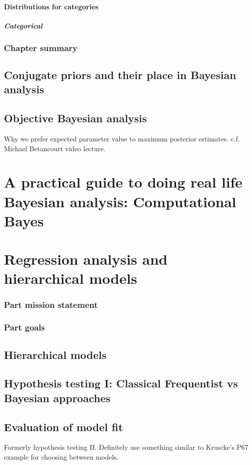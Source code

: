 \documentclass[11pt,fullpage]{book}
\begin{document}
\subsection{Distributions for categories}
\subsubsection{Categorical}
\section{Chapter summary}


\chapter{Conjugate priors and their place in Bayesian analysis}\label{chap:conjugate}

\chapter{Objective Bayesian analysis}\label{chap:ObjectiveBayes}

Why we prefer expected parameter value to maximum posterior estimates. c.f. Michael Betancourt video lecture.

\part{A practical guide to doing real life Bayesian analysis: Computational Bayes}\label{part:computationalBayes}

\part{Regression analysis and hierarchical models}\label{part:regressionHierarchical}
\section{Part mission statement}
\section{Part goals}

\chapter{Hierarchical models}\label{chap:hierarchicalModels}
\chapter{Hypothesis testing I: Classical Frequentist vs Bayesian approaches}

\chapter{Evaluation of model fit}\label{chap:ModelFit}
Formerly hypothesis testing II. Definitely use something similar to Kruscke's P67 example for choosing between models.






\end{document}
